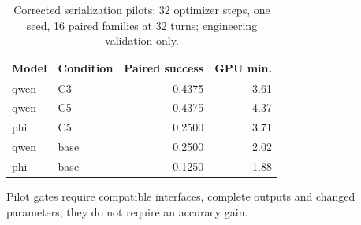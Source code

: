 \begin{table}[ht]\centering
\caption{Corrected serialization pilots: 32 optimizer steps, one seed, 16 paired families at 32 turns; engineering validation only.}
\begin{tabular}{llrr}\toprule Model & Condition & Paired success & GPU min.\\\midrule
qwen & C3 & 0.4375 & 3.61\\
qwen & C5 & 0.4375 & 4.37\\
phi & C5 & 0.2500 & 3.71\\
qwen & base & 0.2500 & 2.02\\
phi & base & 0.1250 & 1.88\\
\bottomrule\end{tabular}\end{table}
Pilot gates require compatible interfaces, complete outputs and changed parameters; they do not require an accuracy gain.
